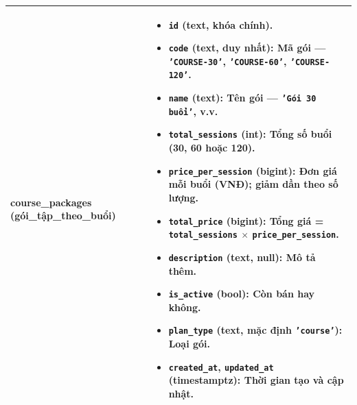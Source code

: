 \begin{longtable}{|>{\centering\arraybackslash}m{4.5cm}|>{\raggedright\arraybackslash}m{11.5cm}|}
\textbf{course\_packages} \newline (gói\_tập\_theo\_buổi) &
\begin{itemize}
    \item \texttt{id} (text, khóa chính).
    \item \texttt{code} (text, duy nhất): Mã gói — \texttt{'COURSE-30'}, \texttt{'COURSE-60'}, \texttt{'COURSE-120'}.
    \item \texttt{name} (text): Tên gói — \texttt{'Gói 30 buổi'}, v.v.
    \item \texttt{total\_sessions} (int): Tổng số buổi (30, 60 hoặc 120).
    \item \texttt{price\_per\_session} (bigint): Đơn giá mỗi buổi (VNĐ); giảm dần theo số lượng.
    \item \texttt{total\_price} (bigint): Tổng giá = \texttt{total\_sessions} $\times$ \texttt{price\_per\_session}.
    \item \texttt{description} (text, null): Mô tả thêm.
    \item \texttt{is\_active} (bool): Còn bán hay không.
    \item \texttt{plan\_type} (text, mặc định \texttt{'course'}): Loại gói.
    \item \texttt{created\_at}, \texttt{updated\_at} (timestamptz): Thời gian tạo và cập nhật.
\end{itemize} \\ \hline


\end{longtable}
